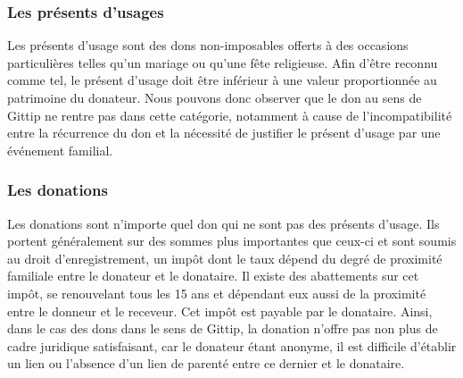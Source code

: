             \subsubsection{Les présents d'usages}
                Les présents d'usage sont des dons non-imposables offerts à des
                occasions particulières telles qu'un mariage ou qu'une fête
                religieuse.
                Afin d'être reconnu comme tel, le présent d'usage doit être
                inférieur à une valeur proportionnée au patrimoine du donateur.
                Nous pouvons donc observer que le don au sens de Gittip ne
                rentre pas dans cette catégorie, notamment à cause de
                l'incompatibilité entre la récurrence du don et la nécessité de
                justifier le présent d'usage par une événement familial.

            \subsubsection{Les donations}
                Les donations sont n'importe quel don qui ne sont pas des présents
                d'usage. Ils portent généralement sur des sommes plus importantes
                que ceux-ci et sont soumis au droit d'enregistrement, un impôt
                dont le taux dépend du degré de proximité familiale entre le
                donateur et le donataire.
                Il existe des abattements sur cet impôt, se renouvelant tous
                les 15 ans et dépendant eux aussi de la proximité entre le
                donneur et le receveur. Cet impôt est payable par le donataire.
                Ainsi, dans le cas des dons dans le sens de Gittip, la donation
                n'offre pas non plus de cadre juridique satisfaisant, car le
                donateur étant anonyme, il est difficile d'établir un lien ou
                l'absence d'un lien de parenté entre ce dernier et le donataire.

